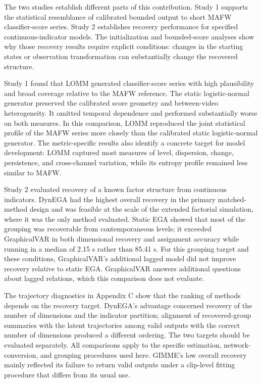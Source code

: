 \documentclass[
]{article}
\begin{document}
The two studies establish different parts of this contribution. Study 1
supports the statistical resemblance of calibrated bounded output to
short MAFW classifier-score series. Study 2 establishes recovery
performance for specified continuous-indicator models. The
initialization and bounded-score analyses show why those recovery
results require explicit conditions: changes in the starting states or
observation transformation can substantially change the recovered
structure.

Study 1 found that LOMM generated classifier-score series with high
plausibility and broad coverage relative to the MAFW reference. The
static logistic-normal generator preserved the calibrated score geometry
and between-video heterogeneity. It omitted temporal dependence and
performed substantially worse on both measures. In this comparison, LOMM
reproduced the joint statistical profile of the MAFW series more closely
than the calibrated static logistic-normal generator. The
metric-specific results also identify a concrete target for model
development: LOMM captured most measures of level, dispersion, change,
persistence, and cross-channel variation, while its entropy profile
remained less similar to MAFW.

Study 2 evaluated recovery of a known factor structure from continuous
indicators. DynEGA had the highest overall recovery in the primary
matched-method design and was feasible at the scale of the extended
factorial simulation, where it was the only method evaluated. Static EGA
showed that most of the grouping was recoverable from contemporaneous
levels; it exceeded GraphicalVAR in both dimensional recovery and
assignment accuracy while running in a median of 2.15 s rather than
85.41 s. For this grouping target and these conditions, GraphicalVAR's
additional lagged model did not improve recovery relative to static EGA.
GraphicalVAR answers additional questions about lagged relations, which
this comparison does not evaluate.

The trajectory diagnostics in Appendix C show that the ranking of
methods depends on the recovery target. DynEGA's advantage concerned
recovery of the number of dimensions and the indicator partition;
alignment of recovered-group summaries with the latent trajectories
among valid outputs with the correct number of dimensions produced a
different ordering. The two targets should be evaluated separately. All
comparisons apply to the specific estimation, network-conversion, and
grouping procedures used here. GIMME's low overall recovery mainly
reflected its failure to return valid outputs under a clip-level fitting
procedure that differs from its usual use.
\end{document}
